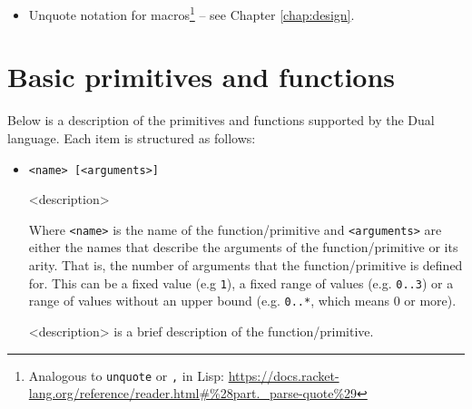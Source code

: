 \begin{itemize}
\begin{lstlisting}
        -- logs `Hello, Bill.`
        log ['[Hello, {name}.]]
    \end{lstlisting}
    
    As we can see this gives us a very convenient notation for string interpolation, similar to e.g. template literals in JavaScript\footnote{\url{https://developer.mozilla.org/en-US/docs/Web/JavaScript/Reference/Template_literals}}.
    In order to escape curly braces, they should be doubled:
    \begin{lstlisting}
        -- logs `Hello, {name}.`
        log ['[Hello, {{name}}.]]
    \end{lstlisting}
    
    I also added a special type of string -- an HTML string, where interpolation notation is the other way around -- double braces cause substitution, single braces do nothing:
    \begin{lstlisting}
        bind [name '|Bill]
        -- logs `<h1>Hello, Bill.</h1>`
        log [html'[<h1>Hello, {{name}}.</h1>]]
        
        -- logs `<h1>Hello, {name}.</h1>`
        log [html'[<h1>Hello, {name}.</h1>]]
    \end{lstlisting}
    
    This is to enable embedding CSS and JavaScript code inside those strings, without having to constantly escape brace characters.
    
    \item Unquote notation for macros\footnote{Analogous to \texttt{unquote} or \texttt{,} in Lisp: \url{https://docs.racket-lang.org/reference/reader.html\#\%28part._parse-quote\%29}} -- see Chapter \ref{chap:design}.
\end{itemize}

\section{Basic primitives and functions}\label{sec:primitives}
Below is a description of the primitives and functions supported by the Dual language. Each item is structured as follows:
\begin{itemize}
    \item \texttt{<name> [<arguments>]}
    
    <description>
    
    Where \texttt{<name>} is the name of the function/primitive and \texttt{<arguments>} are either the names that describe the arguments of the function/primitive or its arity. That is, the number of arguments that the function/primitive is defined for. This can be a fixed value (e.g \texttt{1}), a fixed range of values (e.g. \texttt{0..3}) or a range of values without an upper bound (e.g. \texttt{0..*}, which means 0 or more).
    
    <description> is a brief description of the function/primitive.
\end{itemize}

